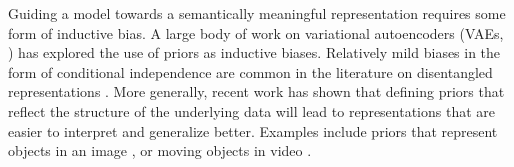 \documentclass{article}
\begin{document}



Guiding a model towards a semantically meaningful representation requires some form of inductive bias. A large body of work on variational autoencoders (VAEs, \cite{kingma2013auto-encoding,rezende2014stochastic}) has explored the use of priors as inductive biases. Relatively mild biases in the form of conditional independence are common in the literature on disentangled representations \citep{higgins2016beta,kim2018disentangling,chen2018isolating,esmaeili2019structured}. More generally, recent work has shown that defining priors that reflect the structure of the underlying data will lead to representations that are easier to interpret and generalize better. Examples include priors that represent objects in an image \citep{eslami2016air,lin2020space,engelcke2019genesis,crawford2019spatially}, or moving objects in video \citep{crawford2019exploiting, kosiorek2018sequential,wu2020amortized,lin2020improving}. 
\end{document}
